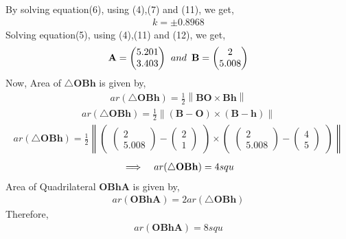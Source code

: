 \documentclass[journal,10pt,twocolumn]{article}
\providecommand{\norm}[1]{\left\lVert#1\right\rVert}
\let\vec\mathbf
\newcommand{\myvec}[1]{\ensuremath{\begin{pmatrix}#1\end{pmatrix}}}
\begin{document}
   By solving equation(6), using (4),(7) and (11), we get,
   \begin{align}
   k=\pm0.8968
   \end{align}
   Solving equation(5), using (4),(11) and (12), we get,
   \begin{align}
   \vec{A}=\myvec{5.201\\3.403}\hspace{0.4em} and\hspace{0.5em}\vec{B}=\myvec{2\\5.008}
   \end{align}
   Now, Area of $\triangle\vec{OBh}$ is given by,
   \begin{align}
   ar(\triangle\vec{OBh})=\frac{1}{2}\norm{\vec{BO}\times\vec{Bh}}
   \end{align}
   \begin{align*}
   ar(\triangle\vec{OBh})=\frac{1}{2}\norm{(\vec{B-O})\times(\vec{B-h})}
   \end{align*}
   \begin{align*}
   ar(\triangle\vec{OBh})=\frac{1}{2}\norm{\myvec{\myvec{2\\5.008}-\myvec{2\\1}}\times\myvec{\myvec{2\\5.008}-\myvec{4\\5}}}
   \end{align*}
   \begin{align}
   \implies\hspace{0.8em}ar(\triangle\vec{OBh})=4 squ
   \end{align}
   Area of Quadrilateral $\vec{OBhA}$ is given by,
   \begin{align}
   ar(\vec{OBhA})=2ar(\triangle\vec{OBh})
   \end{align}
   Therefore,
   \begin{align}
   ar(\vec{OBhA})=8squ
   \end{align}
\end{document}
